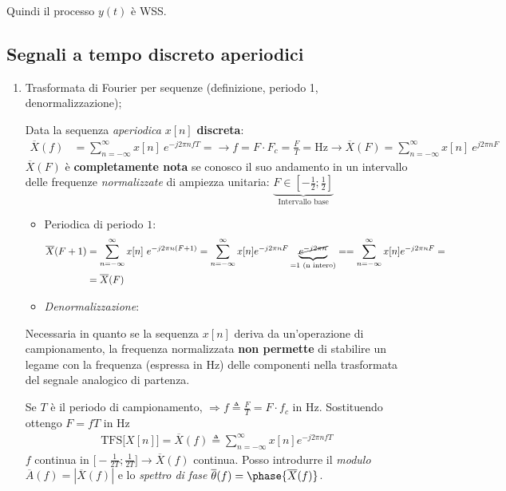 \documentclass[
]{article}
\begin{document}
\begin{enumerate}
\begin{itemize}
    Quindi il processo \(y(t)\) è WSS.
  \end{itemize}
\end{enumerate}

\subsection{Segnali a tempo discreto
aperiodici}\label{segnali-a-tempo-discreto-aperiodici}

\begin{enumerate}
\def\labelenumi{\arabic{enumi}.}
\setcounter{enumi}{1}
\item
  Trasformata di Fourier per sequenze (definizione, periodo 1,
  denormalizzazione);

  Data la sequenza \emph{aperiodica} \(x[n]\) \textbf{discreta}:
  \begin{align*}
   \overline{X}(f) &= \sum_{n=-\infty}^{\infty}x[n]\ e^{-j2\pi nfT} = \longrightarrow f=F\cdot F_{c} = \frac{F}{T} = \si{\hertz} \longrightarrow \overline{X}(F)
   = \sum_{n=-\infty}^{\infty}x[n] \ e^{j2\pi nF}
   \end{align*} \(\overline{X}(F)\) è \textbf{completamente nota} se
  conosco il suo andamento in un intervallo delle frequenze
  \emph{normalizzate} di ampiezza unitaria:
  \(\underbrace{F\in [-\frac{1}{2}; \frac{1}{2}]}_{\text{Intervallo base}}\)

  \begin{itemize}
  \item
    Periodica di periodo \(1\): \begin{align*}
     \overline{X}(F+1) &= \sum_{n=-\infty}^{\infty} x[n] \ e^{-j2\pi n(F+1)} =
     \sum_{n=-\infty}^{\infty} x[n] e^{-j2\pi nF}\underbrace{\cancel{e^{-j2\pi n}}}_{=1 \text{ (n intero)}} =
     =\sum_{n=-\infty}^{\infty} x[n] e^{-j2\pi nF} = \\ &= \overline{X}(F)
     \end{align*}
  \item
    \emph{Denormalizzazione}:
  \end{itemize}

  Necessaria in quanto se la sequenza \(x[n]\) deriva da un'operazione
  di campionamento, la frequenza normalizzata \textbf{non permette} di
  stabilire un legame con la frequenza (espressa in \si{\Hz}) delle
  componenti nella trasformata del segnale analogico di partenza.

  Se \(T\) è il periodo di campionamento,
  \(\Rightarrow f \triangleq \frac{F}{T} = F \cdot f_{c}\) in
  \si{\hertz}. Sostituendo ottengo \(F=fT\) in \si{\Hz} \begin{gather*}
   \text{TFS}\Big[X[n]\Big] = \overline{X}(f) \triangleq \sum_{n=-\infty}^{\infty} x[n] e^{-j2\pi nfT}
   \end{gather*} \(f\) continua in
  \(\Big[ -\frac{1}{2T}; \frac{1}{2T} \Big] \to \overline{X}(f)\)
  continua. Posso introdurre il \emph{modulo}
  \(\overline{A}(f)=|\overline{X}(f)|\) e lo \emph{spettro di fase}
  \(\overline{\theta}(f)= \phase{\overline{X}(f)}\).


\end{enumerate}
\end{document}
